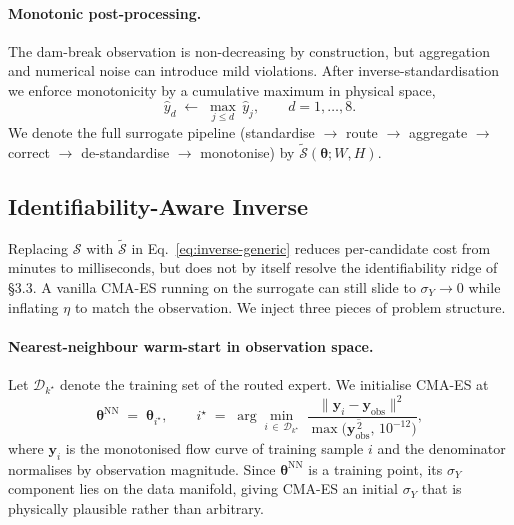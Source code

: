 \paragraph{Monotonic post-processing.}
The dam-break observation is non-decreasing by construction, but
aggregation and numerical noise can introduce mild violations. After
inverse-standardisation we enforce monotonicity by a cumulative
maximum in physical space,
\begin{equation}
\label{eq:mono}
    \hat{y}_{d}
    \;\leftarrow\; \max_{j\le d}\,\hat{y}_{j},
    \qquad d = 1,\dots,8.
\end{equation}
We denote the full surrogate pipeline
(standardise $\to$ route $\to$ aggregate $\to$ correct $\to$
de-standardise $\to$ monotonise) by
$\tilde{\mathcal{S}}(\boldsymbol{\theta}; W, H)$.


\subsection{Identifiability-Aware Inverse}
\label{sec:inverse}

Replacing $\mathcal{S}$ with $\tilde{\mathcal{S}}$ in
Eq.~\eqref{eq:inverse-generic} reduces per-candidate cost from
minutes to milliseconds, but does not by itself resolve the
identifiability ridge of \S3.3. A vanilla CMA-ES running on the
surrogate can still slide to $\sigma_Y \to 0$ while inflating $\eta$
to match the observation. We inject three pieces of problem
structure.

\paragraph{Nearest-neighbour warm-start in observation space.}
Let $\mathcal{D}_{k^{\star}}$ denote the training set of the routed
expert. We initialise CMA-ES at
\begin{equation}
\label{eq:nn}
    \boldsymbol{\theta}^{\mathrm{NN}}
    \;=\; \boldsymbol{\theta}_{i^{\star}},
    \qquad
    i^{\star}
    \;=\;
    \arg\min_{i\,\in\,\mathcal{D}_{k^{\star}}}\;
    \frac{\|\mathbf{y}_i - \mathbf{y}_{\mathrm{obs}}\|^{2}}
         {\max\!\bigl(\overline{\mathbf{y}_{\mathrm{obs}}^{\,2}},\,10^{-12}\bigr)},
\end{equation}
where $\mathbf{y}_i$ is the monotonised flow curve of training
sample $i$ and the denominator normalises by observation magnitude.
Since $\boldsymbol{\theta}^{\mathrm{NN}}$ is a training point, its
$\sigma_Y$ component lies on the data manifold, giving CMA-ES an
initial $\sigma_Y$ that is physically plausible rather than arbitrary.

